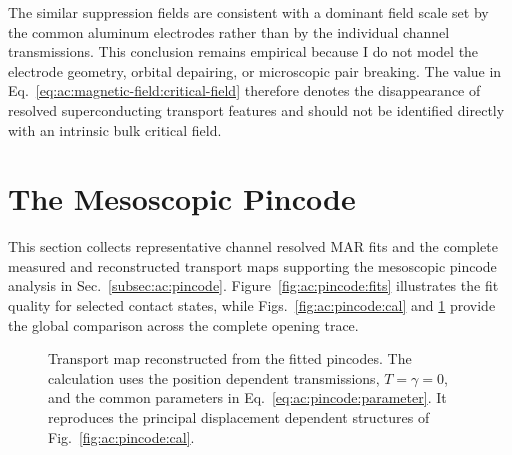         The similar suppression fields are consistent with a dominant field scale set by the common aluminum electrodes rather than by the individual channel transmissions. This conclusion remains empirical because I do not model the electrode geometry, orbital depairing, or microscopic pair breaking. The value in Eq.~\eqref{eq:ac:magnetic-field:critical-field} therefore denotes the disappearance of resolved superconducting transport features and should not be identified directly with an intrinsic bulk critical field.


    \clearpage
    \section{The Mesoscopic Pincode}
    \label{appendix:ac:pincode}

        This section collects representative channel resolved MAR fits and the complete measured and reconstructed transport maps supporting the mesoscopic pincode analysis in Sec.~\ref{subsec:ac:pincode}. Figure~\ref{fig:ac:pincode:fits} illustrates the fit quality for selected contact states, while Figs.~\ref{fig:ac:pincode:cal} and \ref{fig:ac:pincode:sim} provide the global comparison across the complete opening trace.

        \begin{figure}[p]
            \centering
            \caption{
                Measured transport map during contact opening. The \textit{I--V}, \textit{dI--dV}, and \textit{dV--dI} representations show the evolving MAR structure as a function of the approximate relative displacement $x$. Abrupt spectral changes separate successive contact configurations.
                }
            \label{fig:ac:pincode:cal}


            \caption{
                Transport map reconstructed from the fitted pincodes. The calculation uses the position dependent transmissions, $T=\gamma=0$, and the common parameters in Eq.~\eqref{eq:ac:pincode:parameter}. It reproduces the principal displacement dependent structures of Fig.~\ref{fig:ac:pincode:cal}.
                }
            \label{fig:ac:pincode:sim}
        \end{figure}

